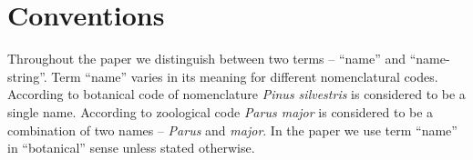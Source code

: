 \documentclass{bmcart}
\begin{document}
\begin{frontmatter}
\begin{abstractbox}

\begin{keyword}
\end{keyword}


\end{abstractbox}
%

\end{frontmatter}



\section*{Conventions}

Throughout the paper we distinguish between two terms -- ``name'' and
``name-string''. Term ``name'' varies in its meaning for different
nomenclatural codes. According to botanical code of nomenclature \cite{ICN}
\textit{Pinus silvestris} is considered to be a single name. According to
zoological code \cite{ICZN} \textit{Parus major} is considered to be a
combination of two names -- \textit{Parus} and \textit{major}. In the paper we
use term ``name'' in ``botanical'' sense unless stated otherwise.
\end{document}
